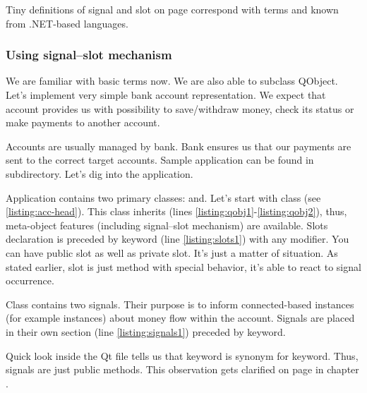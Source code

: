 \begin{fdocextra}
Tiny definitions of signal and slot on page \pageref{desc:sig} correspond with terms  and  known from .NET-based languages. \citep[p.~200-202]{nigel:csharp}
\end{fdocextra}

\subsubsection{Using signal--slot mechanism}
We are familiar with basic terms now. We are also able to subclass QObject. Let's implement very simple bank account representation. We expect that account provides us with possibility to save/withdraw money, check its status or make payments to another account.

Accounts are usually managed by bank. Bank ensures us that our payments are sent to the correct target accounts. Sample application can be found in subdirectory. Let's dig into the application.

Application contains two primary classes: and. Let's start with class (see \autoref{listing:acc-head}). This class inherits (lines \ref{listing:qobj1}-\ref{listing:qobj2}), thus, meta-object features (including signal--slot mechanism) are available. Slots declaration is preceded by keyword (line \ref{listing:slots1}) with any modifier. You can have public slot as well as private slot. It's just a matter of situation. As stated earlier, slot is just method with special behavior, it's able to react to signal occurrence.

Class  contains two signals. Their purpose is to inform connected-based instances (for example instances) about money flow within the account. Signals are placed in their own section (line \ref{listing:signals1}) preceded by keyword.

\begin{fdocextra}
Quick look inside the Qt file tells us that keyword is synonym for keyword. Thus, signals are just public methods. This observation gets clarified on page \pageref{section:mocfun} in chapter .
\end{fdocextra}

